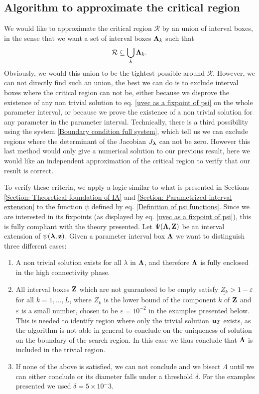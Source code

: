 \documentclass[
11pt, %
english, %
singlespacing, %
nolistspacing, %
liststotoc, %
headsepline, %
]{MastersDoctoralThesis} %
\begin{document}
\subsection{Algorithm to approximate the critical region}

We would like to approximate the critical region $\mathcal{R}$ by an union of interval boxes, in the sense that we want a set of interval boxes $\boldsymbol{\mathrm{\Lambda}}_k$ such that
\begin{align}
	\mathcal{R} \subseteq \bigcup_k \boldsymbol{\mathrm{\Lambda}}_k.
\end{align}	
Obviously, we would this union to be the tightest possible around $\mathcal{R}$. However, we can not directly find such an union, the best we can do is to exclude interval boxes where the critical region can not be, either because we disprove the existence of any non trivial solution to eq. \eqref{uvec as a fixpoint of psi} on the whole parameter interval, or because we prove the existence of a non trivial solution for any parameter in the parameter interval. Technically, there is a third possibility using the system \eqref{Boundary condition full system}, which tell us we can exclude regions where the determinant of the Jacobian $J_{\boldsymbol{\mathrm{\lambda}}}$ can not be zero. However this last method would only give a numerical solution to our previous result, here we would like an independent approximation of the critical region to verify that  our result is correct.

To verify these criteria, we apply a logic similar to what is presented in Sections \ref{Section: Theoretical foundation of IA} and \ref{Section: Parametrized interval extension} to the function $\psi$ defined by eq. \eqref{Definition of psi functions}. Since we are interested in its fixpoints (as displayed by eq. \eqref{uvec as a fixpoint of psi}), this is fully compliant with the theory presented. Let $\Psi(\boldsymbol{\mathrm{\Lambda}}, \boldsymbol{\mathrm{Z}})$ be an interval extension of $\psi(\boldsymbol{\mathrm{\lambda}}, \boldsymbol{\mathrm{z}})$. Given a parameter interval box $\boldsymbol{\mathrm{\Lambda}}$ we want to distinguish three different cases:
\begin{enumerate}
	\item A non trivial solution exists for all $\lambda$ in $\boldsymbol{\mathrm{\Lambda}}$, and therefore $\boldsymbol{\mathrm{\Lambda}}$ is fully enclosed in the high connectivity phase.
	\item All interval boxes $\boldsymbol{\mathrm{Z}}$ which are not guaranteed to be empty satisfy $\underline{Z_k} > 1 - \varepsilon$ for all $k = 1, \dots, L$, where $\underline{Z_k}$ is the lower bound of the component $k$ of $\boldsymbol{\mathrm{Z}}$ and $\varepsilon$ is a small number, chosen to be $\varepsilon = 10^{-2}$ in the examples presented below. This is needed to identify region where only the trivial solution $\boldsymbol{\mathrm{u}}_T$ exists, as the algorithm is not able in general to conclude on the uniqueness of solution on the boundary of the search region. In this case we thus conclude that $\boldsymbol{\mathrm{\Lambda}}$ is included in the trivial region.
	\item If none of the above is satisfied, we can not conclude and we bisect $\Lambda$ until we can either conclude or its diameter falls under a threshold $\delta$. For the examples presented we used $\delta = 5 \times 10^-3$.
\end{enumerate}
\end{document}
